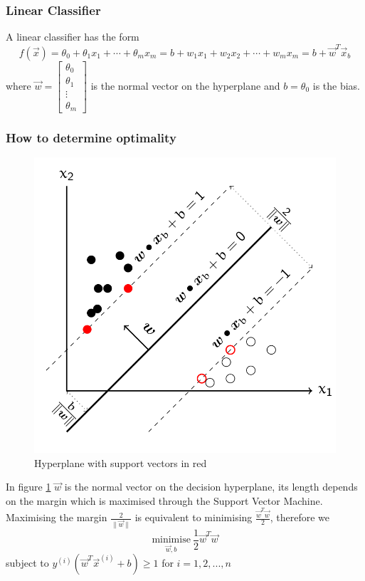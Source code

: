 \documentclass[a4paper, 11pt]{article}
\begin{document}
\subsubsection{Linear Classifier}
A linear classifier has the form
\begin{equation}
f(\vec{x}) = \theta_0 + \theta_1 x_1 + \cdots + \theta_m x_m = b + w_1 x_1 + w_2 x_2 + \cdots + w_m x_m = b + \vec{w}^T \vec{x}_b
\end{equation}
\noindent
where $\vec{w} = \begin{bmatrix}
\theta_0\\\theta_1\\\vdots\\\theta_m
\end{bmatrix}$ is the normal vector on the hyperplane and $b = \theta_0$ is the bias.

\subsubsection{How to determine optimality}

\begin{figure}[htb!]
	\centering
	\includegraphics[keepaspectratio, width=0.4\linewidth]{Pictures/support_vector_machine_hyperplane}
	\caption{Hyperplane with support vectors in red}
	\label{fig:supportvectormachinehyperplane}
\end{figure}

In figure \ref{fig:supportvectormachinehyperplane} $\vec{w}$ is the normal vector on the decision hyperplane, its length depends on the margin which is
maximised through the Support Vector Machine. Maximising the margin $\frac{2}{\| \vec{w} \|}$ is equivalent to minimising $\frac{\vec{w}^T \vec{w}}{2}$, therefore we
\begin{equation}\label{eq:hard_margin_problem}
\underset{\vec{w}, b}{\text{minimise}}\ \frac{1}{2}\vec{w}^T \vec{w}
\end{equation}
\noindent
subject to $y^{(i)}(\vec{w}^T \vec{x}^{(i)}+b)\geq 1$ for $i = 1,2,...,n$
\end{document}

